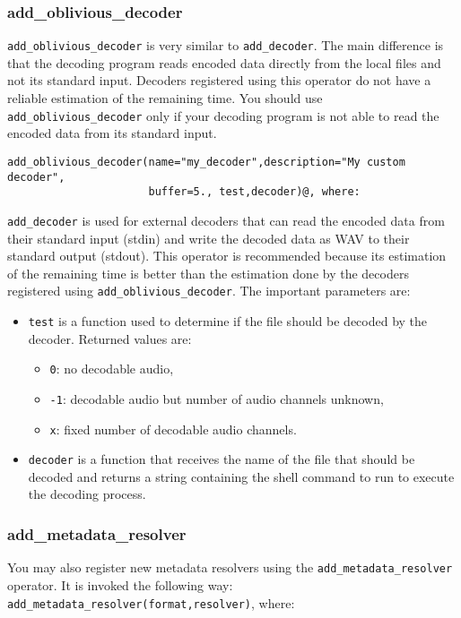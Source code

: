 \documentclass{book}
\begin{document}
\subsubsection{add\_oblivious\_decoder}
\verb+add_oblivious_decoder+ is very similar to \verb+add_decoder+. The main difference is that the
decoding program reads encoded data directly from the local files and not its standard input.
Decoders registered using this operator do not have a reliable estimation of the remaining
time. You should use \verb+add_oblivious_decoder+ only if your decoding program is not able
to read the encoded data from its standard input.

\begin{verbatim}
add_oblivious_decoder(name="my_decoder",description="My custom decoder",
                      buffer=5., test,decoder)@, where:
\end{verbatim}
\verb+add_decoder+ is used for external decoders that can read the encoded data from their standard
input (stdin) and write the decoded data as WAV to their standard output (stdout). This operator
is recommended because its estimation of the remaining time is better than the estimation done
by the decoders registered using \verb+add_oblivious_decoder+. The important parameters are:

\begin{itemize}
\item \verb+test+ is a function used to determine if the file should be decoded by the decoder. Returned values are: \begin{itemize}
\item \verb+0+: no decodable audio,
\item \verb+-1+: decodable audio but number of audio channels unknown,
\item \verb+x+: fixed number of decodable audio channels.

\end{itemize}

\item \verb+decoder+ is a function that receives the name of the file that should be decoded and returns a string containing the shell command to run to execute the decoding process.

\end{itemize}
\subsubsection{add\_metadata\_resolver}
You may also register new metadata resolvers using the \verb+add_metadata_resolver+ operator. It is invoked the
following way: \verb+add_metadata_resolver(format,resolver)+, where:
\end{document}
